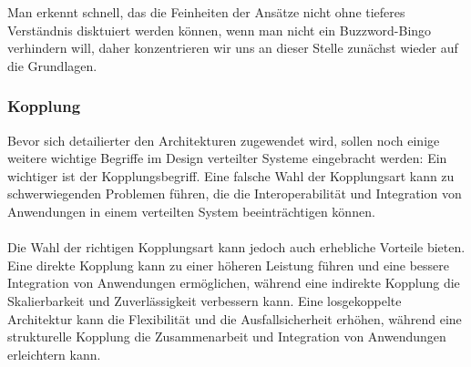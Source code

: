 \documentclass[../vs-script-first-v01.tex]{subfiles}
\begin{document}
Man erkennt schnell, das die Feinheiten der Ansätze nicht ohne tieferes Verständnis disktuiert werden können, wenn man nicht ein Buzzword-Bingo verhindern will, daher konzentrieren wir uns an dieser Stelle zunächst wieder auf die Grundlagen.

\subsubsection{Kopplung}
Bevor sich detailierter den Architekturen zugewendet wird, sollen noch einige weitere wichtige Begriffe im Design verteilter Systeme eingebracht werden: Ein wichtiger ist der Kopplungsbegriff. 
Eine falsche Wahl der Kopplungsart kann zu schwerwiegenden Problemen führen, die die Interoperabilität und Integration von Anwendungen in einem verteilten System beeinträchtigen können.
\\\\
Die Wahl der richtigen Kopplungsart kann jedoch auch erhebliche Vorteile bieten. Eine direkte Kopplung kann zu einer höheren Leistung führen und eine bessere Integration von Anwendungen ermöglichen, während eine indirekte Kopplung die Skalierbarkeit und Zuverlässigkeit verbessern kann. Eine losgekoppelte Architektur kann die Flexibilität  und die Ausfallsicherheit erhöhen, während eine strukturelle Kopplung die Zusammenarbeit und Integration von Anwendungen erleichtern kann.
\end{document}
